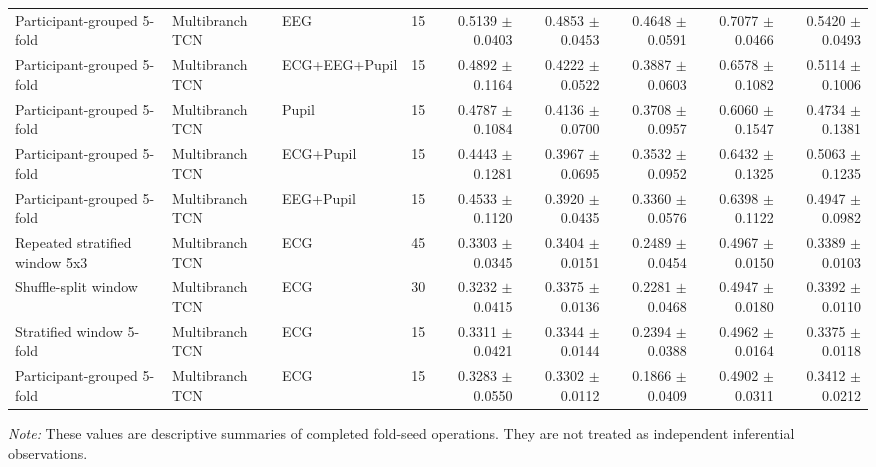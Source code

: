\begin{table}[htbp]
{\begin{tabular}{lllrrrrrr}
Participant-grouped 5-fold & Multibranch TCN & EEG & 15 & 0.5139 $\pm$ 0.0403 & 0.4853 $\pm$ 0.0453 & 0.4648 $\pm$ 0.0591 & 0.7077 $\pm$ 0.0466 & 0.5420 $\pm$ 0.0493 \\
Participant-grouped 5-fold & Multibranch TCN & ECG+EEG+Pupil & 15 & 0.4892 $\pm$ 0.1164 & 0.4222 $\pm$ 0.0522 & 0.3887 $\pm$ 0.0603 & 0.6578 $\pm$ 0.1082 & 0.5114 $\pm$ 0.1006 \\
Participant-grouped 5-fold & Multibranch TCN & Pupil & 15 & 0.4787 $\pm$ 0.1084 & 0.4136 $\pm$ 0.0700 & 0.3708 $\pm$ 0.0957 & 0.6060 $\pm$ 0.1547 & 0.4734 $\pm$ 0.1381 \\
Participant-grouped 5-fold & Multibranch TCN & ECG+Pupil & 15 & 0.4443 $\pm$ 0.1281 & 0.3967 $\pm$ 0.0695 & 0.3532 $\pm$ 0.0952 & 0.6432 $\pm$ 0.1325 & 0.5063 $\pm$ 0.1235 \\
Participant-grouped 5-fold & Multibranch TCN & EEG+Pupil & 15 & 0.4533 $\pm$ 0.1120 & 0.3920 $\pm$ 0.0435 & 0.3360 $\pm$ 0.0576 & 0.6398 $\pm$ 0.1122 & 0.4947 $\pm$ 0.0982 \\
Repeated stratified window 5x3 & Multibranch TCN & ECG & 45 & 0.3303 $\pm$ 0.0345 & 0.3404 $\pm$ 0.0151 & 0.2489 $\pm$ 0.0454 & 0.4967 $\pm$ 0.0150 & 0.3389 $\pm$ 0.0103 \\
Shuffle-split window & Multibranch TCN & ECG & 30 & 0.3232 $\pm$ 0.0415 & 0.3375 $\pm$ 0.0136 & 0.2281 $\pm$ 0.0468 & 0.4947 $\pm$ 0.0180 & 0.3392 $\pm$ 0.0110 \\
Stratified window 5-fold & Multibranch TCN & ECG & 15 & 0.3311 $\pm$ 0.0421 & 0.3344 $\pm$ 0.0144 & 0.2394 $\pm$ 0.0388 & 0.4962 $\pm$ 0.0164 & 0.3375 $\pm$ 0.0118 \\
Participant-grouped 5-fold & Multibranch TCN & ECG & 15 & 0.3283 $\pm$ 0.0550 & 0.3302 $\pm$ 0.0112 & 0.1866 $\pm$ 0.0409 & 0.4902 $\pm$ 0.0311 & 0.3412 $\pm$ 0.0212 \\
\bottomrule
\end{tabular}%
}
\par\medskip\footnotesize\textit{Note:} These values are descriptive summaries of completed fold-seed operations. They are not treated as independent inferential observations.
\end{table}
